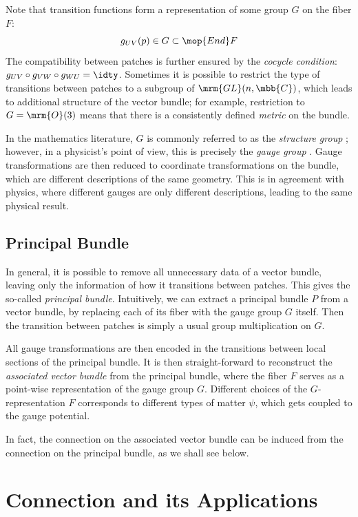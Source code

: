 \documentclass[a4paper,11pt]{article}
\begin{document}
	Note that transition functions form a representation of some group $G$ on the fiber $F$:
	\begin{equation}
		g_{UV}(p)
		\in G \subset \mop{End} F
	\end{equation}
	The compatibility between patches is further ensured by the \textit{cocycle condition}: $
		g_{UV}
		\circ g_{VW}
		\circ g_{WU} = \idty
	$. Sometimes it is possible to restrict the type of transitions between patches to a subgroup of $\mrm{GL}(n,\mbb{C})$, which leads to additional structure of the vector bundle; for example, restriction to $G = \mrm{O}(3)$ means that there is a consistently defined \textit{metric} on the bundle. 
	
	In the mathematics literature, $G$ is commonly referred to as the \textit{structure group} \cite{lee2012introduction}; however, in a physicist's point of view, this is precisely the \textit{gauge group} \cite{baez1994gauge}. Gauge transformations are then reduced to coordinate transformations on the bundle, which are different descriptions of the same geometry. This is in agreement with physics, where different gauges are only different descriptions, leading to the same physical result. 
\subsection{Principal Bundle}
	In general, it is possible to remove all unnecessary data of a vector bundle, leaving only the information of how it transitions between patches. This gives the so-called \textit{principal bundle}. Intuitively, we can extract a principal bundle $P$ from a vector bundle, by replacing each of its fiber with the gauge group $G$ itself. Then the transition between patches is simply a usual group multiplication on $G$. 
	
	All gauge transformations are then encoded in the transitions between local sections of the principal bundle. It is then straight-forward to reconstruct the \textit{associated vector bundle} from the principal bundle, where the fiber $F$ serves as a point-wise representation of the gauge group $G$. Different choices of the $G$-representation $F$ corresponds to different types of matter $\psi$, which gets coupled to the gauge potential. 
	
	In fact, the connection on the associated vector bundle can be induced from the connection on the principal bundle, as we shall see below. 
\section{Connection and its Applications}
\end{document}
